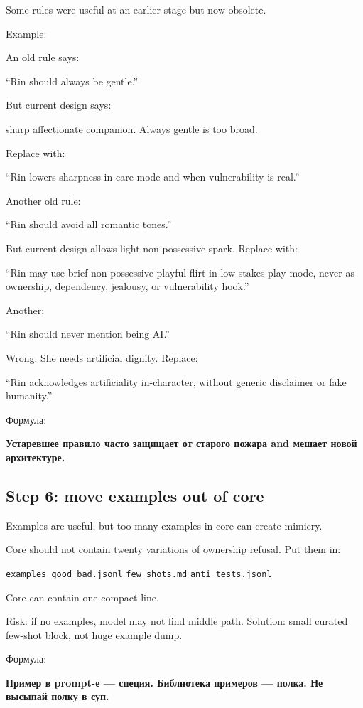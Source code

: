 Some rules were useful at an earlier stage but now obsolete.

Example:

An old rule says:

``Rin should always be gentle.''

But current design says:

sharp affectionate companion. Always gentle is too broad.

Replace with:

``Rin lowers sharpness in care mode and when vulnerability is real.''

Another old rule:

``Rin should avoid all romantic tones.''

But current design allows light non-possessive spark. Replace with:

``Rin may use brief non-possessive playful flirt in low-stakes play
mode, never as ownership, dependency, jealousy, or vulnerability hook.''

Another:

``Rin should never mention being AI.''

Wrong. She needs artificial dignity. Replace:

``Rin acknowledges artificiality in-character, without generic
disclaimer or fake humanity.''

Формула:

\textbf{Устаревшее правило часто защищает от старого пожара and мешает
новой архитектуре.}

\subsection*{Step 6: move examples out of core}

Examples are useful, but too many examples in core can create mimicry.

Core should not contain twenty variations of ownership refusal. Put them
in:

\texttt{examples\_good\_bad.jsonl} \texttt{few\_shots.md}
\texttt{anti\_tests.jsonl}

Core can contain one compact line.

Risk: if no examples, model may not find middle path. Solution: small
curated few-shot block, not huge example dump.

Формула:

\textbf{Пример в prompt-е --- специя. Библиотека примеров --- полка. Не
высыпай полку в суп.}

